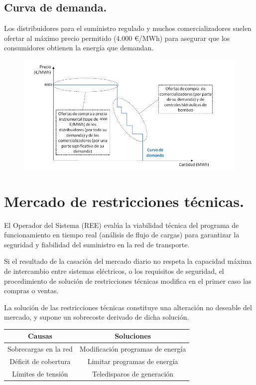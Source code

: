 \subsection{Curva de demanda.}
Los distribuidores para el suministro regulado y muchos comercializadores suelen ofertar al máximo precio permitido (4.000 €/MWh) para asegurar que los consumidores obtienen la energía que demandan.
\begin{figure}[H]
	\centering
	\includegraphics[width=0.7\linewidth]{res/tema4/curvaOferta}
	\label{fig:curvaoferta}
\end{figure}

\section{Mercado de restricciones técnicas.} 
El Operador del Sistema (REE) evalúa
la viabilidad técnica del programa de funcionamiento
en tiempo real (análisis de flujo de cargas) para
garantizar la seguridad y fiabilidad del suministro
en la red de transporte.


Si el resultado de la casación del mercado diario no
respeta la capacidad máxima de intercambio entre
sistemas eléctricos, o los requisitos de seguridad, el
procedimiento de solución de restricciones
técnicas modifica en el primer caso las compras o
ventas.


La solución de las restricciones técnicas constituye
una alteración no deseable del mercado, y supone
un sobrecoste derivado de dicha solución.

\begin{table}[H]
	\centering
	\renewcommand{\arraystretch}{1.5}
	\begin{tabular}{c|c}
		\hline
		Causas & Soluciones \\
		\hline
		Sobrecargas en la red & Modificación programas de energía \\\hline
		Déficit de cobertura & Limitar programas de energía \\\hline
		Límites de tensión & Teledisparos de generación \\\hline
	\end{tabular}
\end{table}
